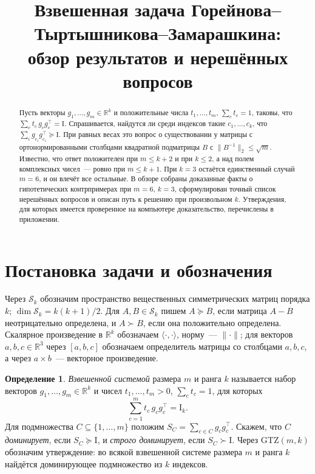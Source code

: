 \documentclass[11pt,a4paper]{article}
\title{Взвешенная задача Горейнова--Тыртышникова--Замарашкина:\\
обзор результатов и нерешённых вопросов}
\author{}
\date{}
\theoremstyle{plain}
\theoremstyle{definition}
\newtheorem{definition}[theorem]{Определение}
\theoremstyle{remark}
\newcommand{\RR}{\mathbb{R}}
\newcommand{\Id}{\mathrm{I}}
\newcommand{\GTZ}{\mathrm{GTZ}}
\newcommand{\Sk}{\mathcal{S}}
\newcommand{\T}{^{\!\top}}
\begin{document}
\maketitle

\begin{abstract}
\noindent
Пусть векторы $g_1,\dots,g_m\in\RR^k$ и положительные числа $t_1,\dots,t_m$,
$\sum_c t_c=1$, таковы, что $\sum_c t_c\,g_cg_c\T=\Id$. Спрашивается, найдутся
ли среди индексов такие $c_1,\dots,c_k$, что
$\sum_i g_{c_i}g_{c_i}\T\succeq\Id$. При равных весах это вопрос о
существовании у матрицы с ортонормированными столбцами квадратной подматрицы
$B$ с $\|B^{-1}\|_2\le\sqrt m$. Известно, что ответ положителен при
$m\le k+2$ и при $k\le2$, а над полем комплексных чисел~--- ровно при
$m\le k+1$. При $k=3$ остаётся единственный случай $m=6$, и он влечёт все
остальные. В обзоре собраны доказанные факты о гипотетических контрпримерах
при $m=6$, $k=3$, сформулирован точный список нерешённых вопросов и описан
путь к решению при произвольном $k$. Утверждения, для которых имеется
проверенное на компьютере доказательство, перечислены в приложении.
\end{abstract}

\tableofcontents

\section{Постановка задачи и обозначения}

Через $\Sk_k$ обозначим пространство вещественных симметрических матриц
порядка $k$; $\dim\Sk_k=k(k+1)/2$. Для $A,B\in\Sk_k$ пишем $A\succeq B$, если
матрица $A-B$ неотрицательно определена, и $A\succ B$, если она положительно
определена. Скалярное произведение в $\RR^k$ обозначаем $\langle\cdot,\cdot\rangle$,
норму~--- $\|\cdot\|$; для векторов $a,b,c\in\RR^3$ через $[a,b,c]$ обозначаем
определитель матрицы со столбцами $a,b,c$, а через $a\times b$~--- векторное
произведение.

\begin{definition}\label{def:system}
\emph{Взвешенной системой} размера $m$ и ранга $k$ называется набор векторов
$g_1,\dots,g_m\in\RR^k$ и чисел $t_1,\dots,t_m>0$, $\sum_c t_c=1$, для которых
\begin{equation}\label{eq:parseval}
  \sum_{c=1}^{m} t_c\, g_cg_c\T=\Id_k .
\end{equation}
Для подмножества $C\subseteq\{1,\dots,m\}$ положим
$S_C=\sum_{c\in C}g_cg_c\T$. Скажем, что $C$ \emph{доминирует}, если
$S_C\succeq\Id$, и \emph{строго доминирует}, если $S_C\succ\Id$. Через
$\GTZ(m,k)$ обозначим утверждение: во всякой взвешенной системе размера $m$
и ранга $k$ найдётся доминирующее подмножество из $k$ индексов.
\end{definition}
\end{document}
